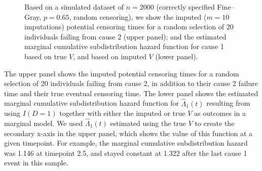 \documentclass[
  letterpaper,
  DIV=11,
  numbers=noendperiod]{scrreprt}
\begin{document}
\begin{figure}


\caption{\label{fig-cens-appendix}Based on a simulated dataset of
\(n = 2000\) (correctly specified Fine--Gray, \(p = 0.65\), random
censoring), we show the imputed (\(m = 10\) imputations) potential
censoring times for a random selection of 20 individuals failing from
cause 2 (upper panel); and the estimated marginal cumulative
subdistribution hazard function for cause 1 based on true \(V\), and
based on imputed \(V\) (lower panel).}

\end{figure}%

The upper panel shows the imputed potential censoring times for a random
selection of 20 individuals failing from cause 2, in addition to their
cause 2 failure time and their true eventual censoring time. The lower
panel shows the estimated marginal cumulative subdistribution hazard
function for \(\hat{\Lambda}_1(t)\) resulting from using \(I(D = 1)\)
together with either the imputed or true \(V\) as outcomes in a marginal
model. We used \(\hat{\Lambda}_1(t)\) estimated using the true \(V\) to
create the secondary x-axis in the upper panel, which shows the value of
this function at a given timepoint. For example, the marginal cumulative
subdistribution hazard was 1.146 at timepoint 2.5, and stayed constant
at 1.322 after the last cause 1 event in this sample.
\end{document}
